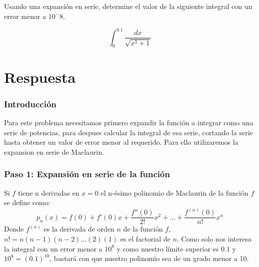 \item Usando una expansión en serie, determine el valor de la siguiente integral con un error menor a $10^-8$.
        \begin{LARGE}
            \begin{equation*}
                \int_0^{0.1} \frac{dx}{\sqrt{x^3 + 1}}
            \end{equation*}
        \end{LARGE}
\section*{Respuesta}
    \subsubsection*{Introducción}
        Para este problema necesitamos primero expandir la función a integrar como una serie de potencias, para despues calcular la integral
        de esa serie, cortando la serie hasta obtener un valor de error menor al requerido. Para ello utilizaremos la expansion en serie de
        Maclaurin.
    \subsubsection*{Paso 1: Expansión en serie de la función}
        Si $f$ tiene n derivadas en $x = 0$ el n-ésimo polinomio de Maclaurin de la función $f$ se define como:
        \begin{equation*}
            p_n(x) = f(0) + f'(0)x + \frac{f''(0)}{2!}x^2 + ... +\frac{f^{(n)}(0)}{n!}x^n
        \end{equation*}
        Donde $f^{(n)}$ es la derivada de orden $n$ de la función $f$, $n! = n(n-1)(n-2)...(2)(1)$ es el factorial de $n$.
        Como solo nos interesa la integral con un error menor a $10^8$ y como nuestro límite superior es $0.1$ y $10^8 = (0.1)^{10} $, bastará
        con que nuestro polinomio sea de un grado menor a 10.

